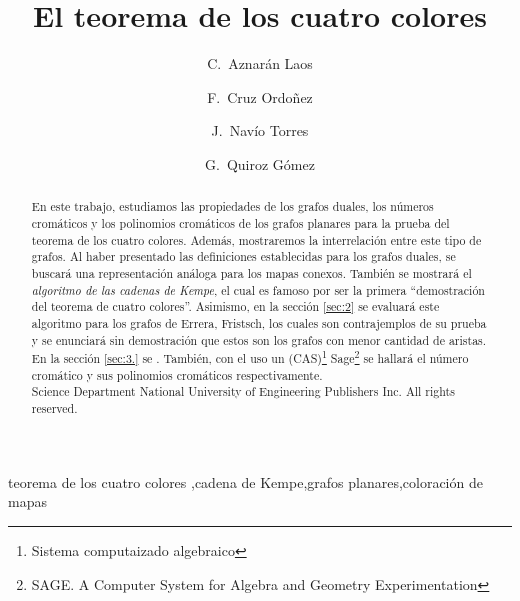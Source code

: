 \documentclass[3p,times,a4paper,twocolumn,authoryear]{elsarticle} %
\begin{document}
\begin{abstract}

En este trabajo, estudiamos las propiedades de los grafos duales, los números cromáticos y los polinomios cromáticos de los grafos planares para la prueba del teorema de los cuatro colores. Además, mostraremos la interrelación entre este tipo de grafos. Al haber presentado las definiciones establecidas para los grafos duales, se buscará una representación análoga para los mapas conexos. También se mostrará el \emph{algoritmo de las cadenas de Kempe}, el cual es famoso por ser la primera ``demostración del teorema de cuatro colores''. Asimismo, en la sección \ref{sec:2} se evaluará este algoritmo para los grafos de Errera, Fristsch, los cuales son contrajemplos de su prueba y se enunciará sin demostración que estos son los grafos con menor cantidad de aristas. En la sección \ref{sec:3.} se  \cite{birkhoff}. También, con el uso un (CAS)\footnote{Sistema computaizado algebraico} Sage\footnote{SAGE. A Computer System for Algebra and Geometry Experimentation} se hallará el número cromático y sus polinomios cromáticos respectivamente.
\\[1mm]
\textcopyright \hspace{.1cm}Science Department National University of Engineering Publishers Inc. All rights reserved.

\end{abstract}

\begin{keyword}
teorema de los cuatro colores \sep cadena de Kempe\sep grafos planares\sep coloración de mapas
\end{keyword}

\begin{frontmatter}

\title{El teorema de los cuatro colores}

\author[1,3]{C.~Aznarán Laos}


\author[1,3]{F.~Cruz Ordoñez}

\author[2,3]{J.~Navío Torres}

\author[1,3]{G.~Quiroz Gómez}

\address[1]{Facultad de Ciencias - Escuela Profesional de Ciencia de la Computación}
\address[2]{Facultad de Ciencias - Escuela Profesional de Matemática}
\address[3]{Universidad Nacional de Ingeniería,	Av. Túpac Amaru 210, Rímac, Lima 25, Perú}

\end{frontmatter}
\end{document}
